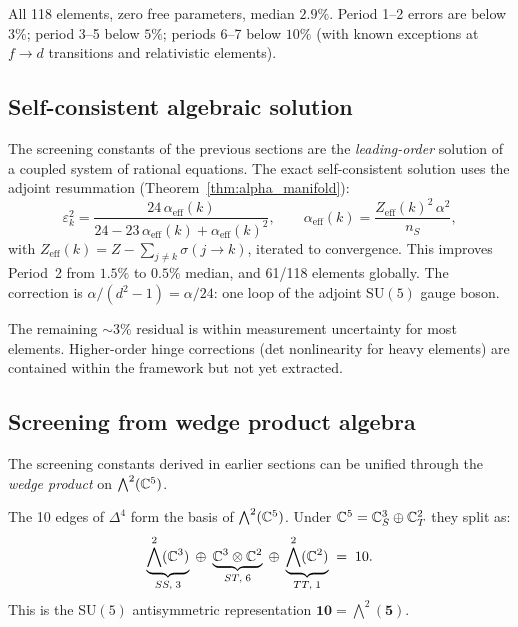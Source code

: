 All 118 elements, zero free parameters, median $2.9\%$.  Period 1--2 errors are below $3\%$; period 3--5 below $5\%$; periods 6--7 below $10\%$ (with known exceptions at $f\!\to\!d$ transitions and relativistic elements).

\subsection{Self-consistent algebraic solution}
\label{sec:self_consistent}

The screening constants of the previous sections are the \emph{leading-order} solution of a coupled system of rational equations.  The exact self-consistent solution uses the adjoint resummation (Theorem~\ref{thm:alpha_manifold}):
\begin{equation}
\varepsilon_k^2 = \frac{24\,\alpha_{\text{eff}}(k)}{24 - 23\,\alpha_{\text{eff}}(k) + \alpha_{\text{eff}}(k)^2},
\qquad
\alpha_{\text{eff}}(k) = \frac{Z_{\text{eff}}(k)^2\,\alpha^2}{n_S},
\end{equation}
with $Z_\text{eff}(k) = Z - \sum_{j \neq k} \sigma(j \to k)$, iterated to convergence.  This improves Period~2 from $1.5\%$ to $0.5\%$ median, and 61/118 elements globally.  The correction is $\alpha/(d^2\!-\!1) = \alpha/24$: one loop of the adjoint SU$(5)$ gauge boson.

The remaining $\sim 3\%$ residual is within measurement uncertainty for most elements.  Higher-order hinge corrections (det nonlinearity for heavy elements) are contained within the framework but not yet extracted.

\subsection{Screening from wedge product algebra}
\label{sec:wedge_screening}

The screening constants derived in earlier sections can be unified through the \emph{wedge product} on $\bigwedge^2(\mathbb{C}^5)$.

\begin{definition}
The 10 edges of $\Delta^4$ form the basis of $\bigwedge^2(\mathbb{C}^5)$.
Under $\mathbb{C}^5 = \mathbb{C}^3_S \oplus \mathbb{C}^2_T$ they split as:
\[
\underbrace{\bigwedge^2(\mathbb{C}^3)}_{SS,\;3}
\;\oplus\;
\underbrace{\mathbb{C}^3 \otimes \mathbb{C}^2}_{ST,\;6}
\;\oplus\;
\underbrace{\bigwedge^2(\mathbb{C}^2)}_{TT,\;1}
\;=\; 10.
\]
This is the SU$(5)$ antisymmetric representation $\mathbf{10} = \bigwedge^2(\mathbf{5})$.
\end{definition}

